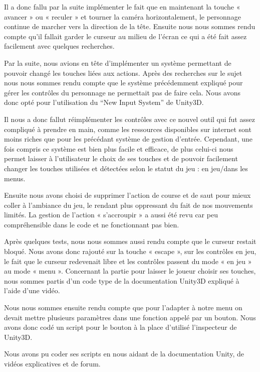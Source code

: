 \newpage

Il a donc fallu par la suite implémenter le fait que en maintenant la touche « avancer » ou « reculer » et tourner la caméra horizontalement, le personnage continue de marcher vers la direction de la tête. Ensuite nous nous sommes rendu compte qu’il fallait garder le curseur au milieu de l’écran ce qui a été fait assez facilement avec quelques recherches.

Par la suite, nous avions en tête d’implémenter un système permettant de pouvoir changé les touches liées aux actions. Après des recherches sur le sujet nous nous sommes rendu compte que le système précédemment expliqué pour gérer les contrôles du personnage ne permettait pas de faire cela. Nous avons donc opté pour l’utilisation du ``New Input System''  de Unity3D.

Il nous a donc fallut réimplémenter les contrôles avec ce nouvel outil qui fut assez compliqué à prendre en main, comme les ressources disponibles sur internet sont moins riches que pour les précédant système de gestion d’entrée. Cependant, une fois compris ce système est bien plus facile et efficace, de plus celui-ci nous permet laisser à l’utilisateur le choix de ses touches et de pouvoir facilement changer les touches utilisées et détectées selon le statut du jeu : en jeu/dans les menus.

Ensuite nous avons choisi de supprimer l’action de course et de saut pour mieux coller à l’ambiance du jeu, le rendant plus oppressant du fait de nos mouvements limités. La gestion de l’action « s’accroupir » a aussi été revu car peu compréhensible dans le code et ne fonctionnant pas bien.

Après quelques tests, nous nous sommes aussi rendu compte que le curseur restait bloqué. Nous avons donc rajouté sur la touche « escape », sur les contrôles en jeu, le fait que le curseur redevenait libre et les contrôles passent du mode « en jeu » au mode « menu ».
Concernant la partie pour laisser le joueur choisir ses touches, nous sommes partis d’un code type de la documentation Unity3D expliqué à l’aide d’une vidéo.

Nous nous sommes ensuite rendu compte que pour l’adapter à notre menu on devait mettre plusieurs paramètres dans une fonction appelé par un bouton. Nous avons donc codé un script pour le bouton à la place d’utilisé l’inspecteur de Unity3D.

Nous avons pu coder ses scripts en nous aidant de la documentation Unity, de vidéos explicatives et de forum.

